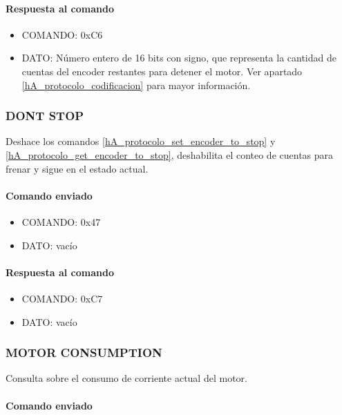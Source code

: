 \paragraph*{Respuesta al comando}

\begin{itemize}
	\item{COMANDO:} 0xC6
	\item{DATO:} N\'umero entero de 16 bits con signo, que representa la cantidad de cuentas del encoder restantes para detener el motor.
		Ver apartado \ref{hA_protocolo_codificacion} para mayor informaci\'on.
\end{itemize}

\subsubsection{DONT STOP}
\label{hA_protocolo_dont_stop}

Deshace los comandos \ref{hA_protocolo_set_encoder_to_stop} y \ref{hA_protocolo_get_encoder_to_stop}, deshabilita el conteo de cuentas para frenar y sigue en el estado actual.

\paragraph*{Comando enviado}

\begin{itemize}
	\item{COMANDO:} 0x47
	\item{DATO:} vac\'io
\end{itemize}

\paragraph*{Respuesta al comando}

\begin{itemize}
	\item{COMANDO:} 0xC7
	\item{DATO:} vac\'io
\end{itemize}

\subsubsection{MOTOR CONSUMPTION}
\label{hA_protocolo_motor_consumption}

Consulta sobre el consumo de corriente actual del motor.

\paragraph*{Comando enviado}


